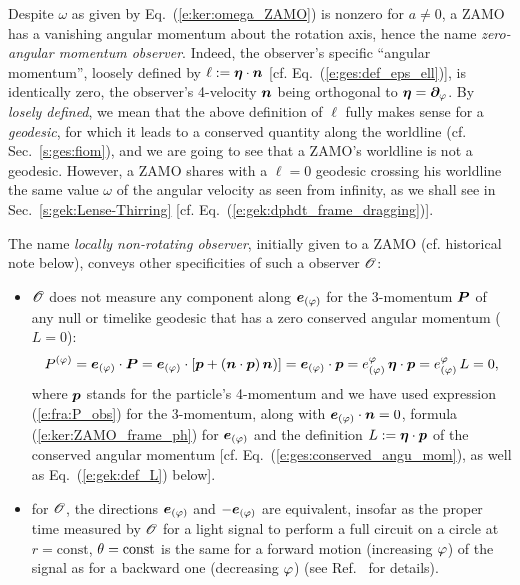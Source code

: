 Despite $\omega$ as given by Eq.~(\ref{e:ker:omega_ZAMO}) is nonzero for $a\neq 0$, a ZAMO has a vanishing angular momentum about the rotation axis,
hence the name \emph{zero-angular momentum observer}. Indeed, the observer's specific ``angular momentum'', loosely defined by $\ell := \bm{\eta}\cdot\bm{n}$ [cf. Eq.~(\ref{e:ges:def_eps_ell})], is identically
zero, the observer's 4-velocity $\bm{n}$ being orthogonal to $\bm{\eta} = \bm{\partial}_\varphi$. By \emph{losely
defined}, we mean that the above definition of $\ell$  fully makes sense for a \emph{geodesic},
for which it leads to
a conserved quantity along the worldline (cf. Sec.~\ref{s:ges:fiom}), and we are going to see
that a ZAMO's worldline is not a geodesic. However, a ZAMO shares with a $\ell=0$ geodesic
crossing his worldline the same value $\omega$ of the angular velocity as seen from infinity,
as we shall see in Sec.~\ref{s:gek:Lense-Thirring} [cf. Eq.~(\ref{e:gek:dphdt_frame_dragging})].


The name \emph{locally non-rotating observer}, initially given to a ZAMO (cf. historical note below),
conveys other specificities of such a observer $\mathscr{O}$:
\begin{itemize}
\item
$\mathscr{O}$ does not measure any component
along $\bm{e}_{(\varphi)}$ for the 3-momentum $\bm{P}$ of any null or timelike geodesic
that has a zero conserved angular momentum ($L=0$):
\[
    P^{(\varphi)} = \bm{e}_{(\varphi)}\cdot\bm{P} = \bm{e}_{(\varphi)}\cdot[\bm{p} + (\bm{n}\cdot\bm{p})\, \bm{n})] =
     \bm{e}_{(\varphi)}\cdot\bm{p} = e_{(\varphi)}^\varphi \, \bm{\eta}\cdot\bm{p} =  e_{(\varphi)}^\varphi \, L = 0 ,
\]
where $\bm{p}$ stands for the particle's 4-momentum and we have used expression
(\ref{e:fra:P_obs}) for the 3-momentum, along with $\bm{e}_{(\varphi)}\cdot\bm{n} = 0$,
formula (\ref{e:ker:ZAMO_frame_ph}) for $\bm{e}_{(\varphi)}$ and the
definition $L := \bm{\eta}\cdot\bm{p}$ of the conserved angular momentum
[cf. Eq.~(\ref{e:ges:conserved_angu_mom}), as well as Eq.~(\ref{e:gek:def_L}) below].
\item for $\mathscr{O}$, the directions $\bm{e}_{(\varphi)}$ and $-\bm{e}_{(\varphi)}$ are equivalent,
insofar as the proper time measured by $\mathscr{O}$ for a light signal to perform a full circuit on a circle
at $r=\mathrm{const}$, $\theta=\mathrm{const}$ is the same for a forward motion (increasing $\varphi$)
of the signal as for a backward one (decreasing $\varphi$)  (see Ref.~\cite{Barde70b} for details).
\end{itemize}

